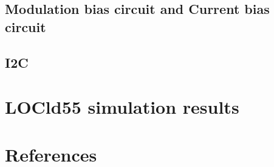 \documentclass[15pt,a4paper]{article}
\begin{document}
\begin{spacing}{1.25}
\subsection{Modulation bias circuit and Current bias circuit}

\subsection{I2C}

\section{LOCld55 simulation results}        %

\section{References}                        %

\end{spacing}
\end{document}

